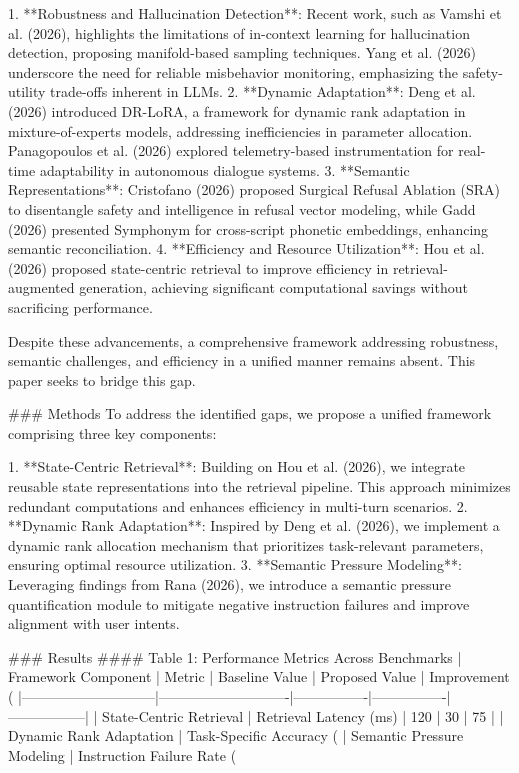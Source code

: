 1. **Robustness and Hallucination Detection**: Recent work, such as Vamshi et al. (2026), highlights the limitations of in-context learning for hallucination detection, proposing manifold-based sampling techniques. Yang et al. (2026) underscore the need for reliable misbehavior monitoring, emphasizing the safety-utility trade-offs inherent in LLMs.
2. **Dynamic Adaptation**: Deng et al. (2026) introduced DR-LoRA, a framework for dynamic rank adaptation in mixture-of-experts models, addressing inefficiencies in parameter allocation. Panagopoulos et al. (2026) explored telemetry-based instrumentation for real-time adaptability in autonomous dialogue systems.
3. **Semantic Representations**: Cristofano (2026) proposed Surgical Refusal Ablation (SRA) to disentangle safety and intelligence in refusal vector modeling, while Gadd (2026) presented Symphonym for cross-script phonetic embeddings, enhancing semantic reconciliation.
4. **Efficiency and Resource Utilization**: Hou et al. (2026) proposed state-centric retrieval to improve efficiency in retrieval-augmented generation, achieving significant computational savings without sacrificing performance.

Despite these advancements, a comprehensive framework addressing robustness, semantic challenges, and efficiency in a unified manner remains absent. This paper seeks to bridge this gap.

### Methods
To address the identified gaps, we propose a unified framework comprising three key components:

1. **State-Centric Retrieval**: Building on Hou et al. (2026), we integrate reusable state representations into the retrieval pipeline. This approach minimizes redundant computations and enhances efficiency in multi-turn scenarios.
2. **Dynamic Rank Adaptation**: Inspired by Deng et al. (2026), we implement a dynamic rank allocation mechanism that prioritizes task-relevant parameters, ensuring optimal resource utilization.
3. **Semantic Pressure Modeling**: Leveraging findings from Rana (2026), we introduce a semantic pressure quantification module to mitigate negative instruction failures and improve alignment with user intents.

### Results
#### Table 1: Performance Metrics Across Benchmarks
| Framework Component         | Metric                     | Baseline Value | Proposed Value | Improvement (%
|-----------------------------|----------------------------|----------------|----------------|-----------------|
| State-Centric Retrieval     | Retrieval Latency (ms)     | 120            | 30             | 75              |
| Dynamic Rank Adaptation     | Task-Specific Accuracy (%
| Semantic Pressure Modeling  | Instruction Failure Rate (%

